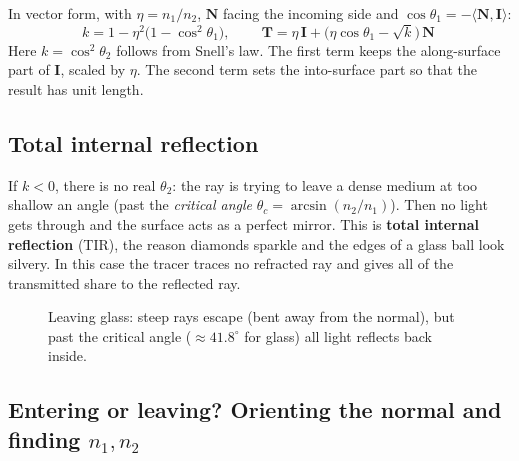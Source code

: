 \documentclass[11pt,a4paper]{article}
\newcommand{\vv}[1]{\mathbf{#1}}
\newcommand{\dotp}[2]{\langle #1, #2\rangle}
\begin{document}
In vector form, with $\eta=n_1/n_2$, $\vv N$ facing the incoming side and
$\cos\theta_1 = -\dotp{\vv N}{\vv I}$:
\[
  k = 1-\eta^2\big(1-\cos^2\theta_1\big),\qquad
  \boxed{\ \vv T = \eta\,\vv I + \big(\eta\cos\theta_1-\sqrt{k}\big)\,\vv N\ }
\]
Here $k=\cos^2\theta_2$ follows from Snell's law. The first term keeps the
along-surface part of $\vv I$, scaled by $\eta$. The second term sets the
into-surface part so that the result has unit length.

\subsection{Total internal reflection}

If $k<0$, there is no real $\theta_2$: the ray is trying to leave a dense medium
at too shallow an angle (past the \emph{critical angle}
$\theta_c=\arcsin(n_2/n_1)$). Then no light gets through and the surface acts as
a perfect mirror. This is \textbf{total internal reflection} (TIR), the reason
diamonds sparkle and the edges of a glass ball look silvery. In this case the
tracer traces no refracted ray and gives all of the transmitted share to the
reflected ray.

\begin{figure}[h]
\centering
{}
\caption{Leaving glass: steep rays escape (bent away from the normal), but past
the critical angle ($\approx 41.8^\circ$ for glass) all light reflects back
inside.}
\end{figure}

\subsection{Entering or leaving? Orienting the normal and finding $n_1,n_2$}
\end{document}
